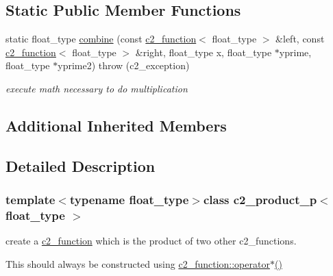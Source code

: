 \subsection*{Static Public Member Functions}
\begin{DoxyCompactItemize}
\item 
\hypertarget{classc2__product__p_a35c37539a7ebc7074d5780a912dcb1d5}{static float\-\_\-type \hyperlink{classc2__product__p_a35c37539a7ebc7074d5780a912dcb1d5}{combine} (const \hyperlink{classc2__function}{c2\-\_\-function}$<$ float\-\_\-type $>$ \&left, const \hyperlink{classc2__function}{c2\-\_\-function}$<$ float\-\_\-type $>$ \&right, float\-\_\-type x, float\-\_\-type $\ast$yprime, float\-\_\-type $\ast$yprime2)  throw (c2\-\_\-exception)}\label{classc2__product__p_a35c37539a7ebc7074d5780a912dcb1d5}

\begin{DoxyCompactList}\small\item\em execute math necessary to do multiplication \end{DoxyCompactList}\end{DoxyCompactItemize}
\subsection*{Additional Inherited Members}


\subsection{Detailed Description}
\subsubsection*{template$<$typename float\-\_\-type$>$class c2\-\_\-product\-\_\-p$<$ float\-\_\-type $>$}

create a \hyperlink{classc2__function}{c2\-\_\-function} which is the product of two other c2\-\_\-functions.

This should always be constructed using \hyperlink{classc2__function_a7744675c98a8ec63320ac1c0b61bec9c}{c2\-\_\-function\-::operator$\ast$()} 

